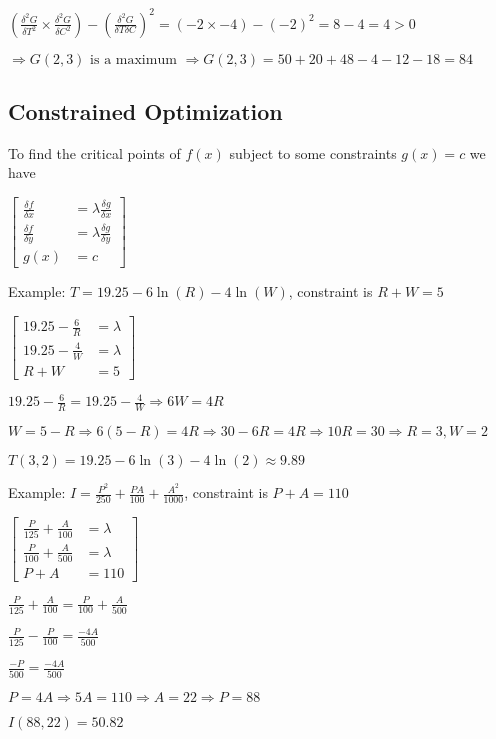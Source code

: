 \documentclass[12pt]{article}
\begin{document}
$(\frac{\delta^{2}G}{\delta T^{2}} \times \frac{\delta^{2} G}{\delta C^{2}}) - (\frac{\delta^{2}G}{\delta T \delta C})^{2} = (-2 \times -4) - (-2)^{2} = 8 - 4 = 4 > 0$

$\Rightarrow G(2, 3) \text{ is a maximum } \Rightarrow G(2,3) = 50 + 20 + 48 - 4 - 12 - 18 = 84$

\subsection{Constrained Optimization}

To find the critical points of $f(x)$ subject to some constraints $g(x) = c$ we have

$\begin{bmatrix}
    \frac{\delta f}{\delta x} & = \lambda\frac{\delta g}{\delta x} \\
    \frac{\delta f}{\delta y} & = \lambda\frac{\delta g}{\delta y} \\
    g(x) & = c
\end{bmatrix}$

Example: $T = 19.25 - 6\ln(R) - 4\ln(W)$, constraint is $R + W = 5$

$\begin{bmatrix}
    19.25 - \frac{6}{R} & = \lambda \\
    19.25 - \frac{4}{W} & = \lambda \\
    R + W & = 5
\end{bmatrix}$

$19.25 - \frac{6}{R} = 19.25 - \frac{4}{W} \Rightarrow 6W = 4R$

$W = 5 - R \Rightarrow 6(5 - R) = 4R \Rightarrow 30 - 6R = 4R \Rightarrow 10R = 30 \Rightarrow R = 3, W = 2$

$T(3, 2) = 19.25 - 6\ln(3) - 4\ln(2) \approx 9.89$

Example: $I = \frac{P^{2}}{250} + \frac{PA}{100} + \frac{A^{2}}{1000}$, constraint is $P + A = 110$

$\begin{bmatrix}
    \frac{P}{125} + \frac{A}{100} & = \lambda \\
    \frac{P}{100} + \frac{A}{500} & = \lambda \\
    P + A & = 110
\end{bmatrix}$

$\frac{P}{125} + \frac{A}{100} = \frac{P}{100} + \frac{A}{500}$

$\frac{P}{125} - \frac{P}{100} = \frac{-4A}{500}$

$\frac{-P}{500} = \frac{-4A}{500}$

$P = 4A \Rightarrow 5A = 110 \Rightarrow A = 22 \Rightarrow P = 88$

$I(88, 22) = 50.82$
\end{document}
